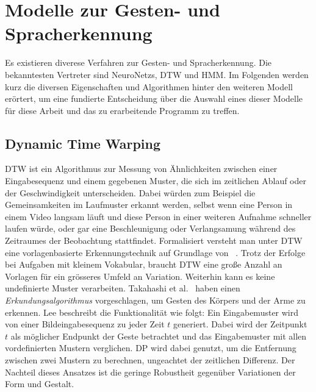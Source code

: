 \chapter{Modelle zur Gesten- und Spracherkennung}
\label{chap:Modelle}
Es existieren diverese Verfahren zur Gesten- und Spracherkennung. Die bekanntesten Vertreter sind \glspl{NeuroNetz}, \gls{DTW} und \gls{HMM}.
\newline
Im Folgenden werden kurz die diversen Eigenschaften und Algorithmen hinter den weiteren Modell er\"ortert, um eine fundierte Entscheidung \"uber die Auswahl eines dieser Modelle f\"ur diese Arbeit und das zu erarbeitende Programm zu treffen.

\section{Dynamic Time Warping}
\gls{DTW} ist ein Algorithmus zur Messung von \"Ahnlichkeiten zwischen einer Eingabesequenz und einem gegebenen Muster, die sich im zeitlichen Ablauf oder der Geschwindigkeit unterscheiden. Dabei w\"urden zum Beispiel die Gemeinsamkeiten im Laufmuster erkannt werden, selbst wenn eine Person in einem Video langsam l\"auft und diese Person in einer weiteren Aufnahme schneller laufen w\"urde, oder gar eine Beschleunigung oder Verlangsamung w\"ahrend des Zeitraumes der Beobachtung stattfindet.
\newline
Formalisiert versteht man unter \acrshort{DTW} eine vorlagenbasierte Erkennungstechnik auf Grundlage von ~\cite[S.~963]{bib:hmmlee}.
Trotz der Erfolge bei Aufgaben mit kleinem Vokabular, braucht \acrshort{DTW} eine gro\ss e Anzahl an Vorlagen f\"ur ein gr\"osseres Umfeld an Variation. Weiterhin kann es keine undefinierte Muster verarbeiten.
\newline
Takahashi et al.~\cite{bib:takahashi} haben einen \textit{Erkundungsalgorithmus} vorgeschlagen, um Gesten des K\"orpers und der Arme zu erkennen. Lee beschreibt die Funktionalit\"at wie folgt: Ein Eingabemuster wird von einer Bildeingabesequenz zu jeder Zeit $t$ generiert. Dabei wird der Zeitpunkt $t$ als m\"oglicher Endpunkt der Geste betrachtet und das Eingabemuster mit allen vordefinierten Mustern verglichen. \gls{DP} wird dabei genutzt, um die Entfernung zwischen zwei Mustern zu berechnen, ungeachtet der zeitlichen Differenz.
\newline
Der Nachteil dieses Ansatzes ist die geringe Robustheit gegen\"uber Variationen der Form und Gestalt.

